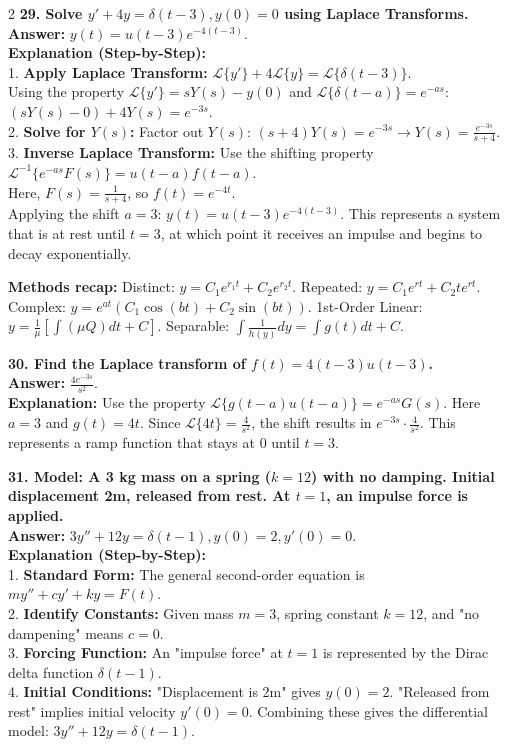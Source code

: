 \documentclass[4pt]{extarticle}
\begin{document}
\begin{multicols}{2}
\textbf{29. Solve $y' + 4y = \delta(t-3), y(0)=0$ using Laplace Transforms.} \\
\textbf{Answer:} $y(t) = u(t-3)e^{-4(t-3)}$. \\
\textbf{Explanation (Step-by-Step):} \\
1. \textbf{Apply Laplace Transform:} $\mathcal{L}\{y'\} + 4\mathcal{L}\{y\} = \mathcal{L}\{\delta(t-3)\}$. \\
Using the property $\mathcal{L}\{y'\} = sY(s) - y(0)$ and $\mathcal{L}\{\delta(t-a)\} = e^{-as}$: \\
$(sY(s) - 0) + 4Y(s) = e^{-3s}$. \\
2. \textbf{Solve for $Y(s)$:} Factor out $Y(s)$: $(s+4)Y(s) = e^{-3s} \rightarrow Y(s) = \frac{e^{-3s}}{s+4}$. \\
3. \textbf{Inverse Laplace Transform:} Use the shifting property $\mathcal{L}^{-1}\{e^{-as}F(s)\} = u(t-a)f(t-a)$. \\
Here, $F(s) = \frac{1}{s+4}$, so $f(t) = e^{-4t}$. \\
Applying the shift $a=3$: $y(t) = u(t-3)e^{-4(t-3)}$. This represents a system that is at rest until $t=3$, at which point it receives an impulse and begins to decay exponentially.

\textbf{Methods recap:} Distinct: $y = C_1e^{r_1t} + C_2e^{r_2t}$. Repeated: $y = C_1e^{rt} + C_2te^{rt}$. Complex: $y = e^{at}(C_1 \cos(bt) + C_2 \sin(bt))$. 1st-Order Linear: $y = \frac{1}{\mu} [\int (\mu Q) dt + C]$. Separable: $\int \frac{1}{h(y)} dy = \int g(t) dt + C$.

\textbf{30. Find the Laplace transform of $f(t) = 4(t-3)u(t-3)$.} \\
\textbf{Answer:} $\frac{4e^{-3s}}{s^2}$. \\
\textbf{Explanation:} Use the property $\mathcal{L}\{g(t-a)u(t-a)\} = e^{-as}G(s)$. Here $a=3$ and $g(t) = 4t$. Since $\mathcal{L}\{4t\} = \frac{4}{s^2}$, the shift results in $e^{-3s} \cdot \frac{4}{s^2}$. This represents a ramp function that stays at 0 until $t=3$.

\textbf{31. Model: A 3 kg mass on a spring ($k=12$) with no damping. Initial displacement 2m, released from rest. At $t=1$, an impulse force is applied.} \\
\textbf{Answer:} $3y'' + 12y = \delta(t-1), y(0)=2, y'(0)=0$. \\
\textbf{Explanation (Step-by-Step):} \\
1. \textbf{Standard Form:} The general second-order equation is $my'' + cy' + ky = F(t)$. \\
2. \textbf{Identify Constants:} Given mass $m=3$, spring constant $k=12$, and "no dampening" means $c=0$. \\
3. \textbf{Forcing Function:} An "impulse force" at $t=1$ is represented by the Dirac delta function $\delta(t-1)$. \\
4. \textbf{Initial Conditions:} "Displacement is 2m" gives $y(0)=2$. "Released from rest" implies initial velocity $y'(0)=0$. Combining these gives the differential model: $3y'' + 12y = \delta(t-1)$.


\end{multicols}
\end{document}
